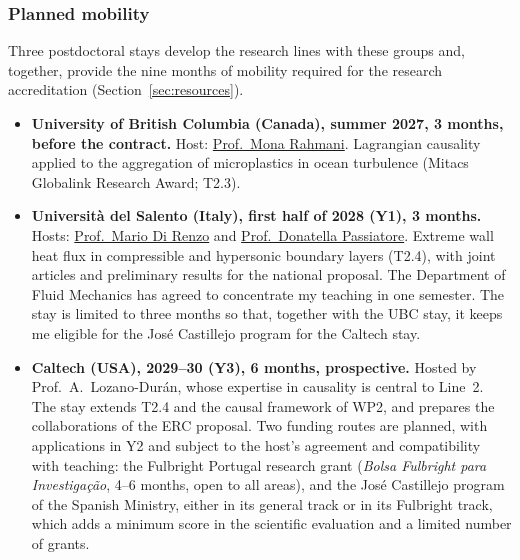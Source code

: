 \documentclass[11pt]{article}
\begin{document}
\subsubsection*{Planned mobility}
Three postdoctoral stays develop the research lines with these groups and, together, provide the
nine months of mobility required for the research accreditation (Section~\ref{sec:resources}).
\begin{itemize}
  \item \textbf{University of British Columbia (Canada), summer 2027, 3 months, before the
  contract.} Host: \href{https://chbe.ubc.ca/mona-rahmani/}{Prof.\ Mona Rahmani}. Lagrangian
  causality applied to the aggregation of microplastics in ocean turbulence (Mitacs Globalink
  Research Award; T2.3).
  
  \item \textbf{Universit\`a del Salento (Italy), first half of 2028 (Y1), 3 months.} Hosts:
  \href{https://www.unisalento.it/scheda-utente/-/people/mario.direnzo}{Prof.\ Mario Di Renzo}
  and \href{https://www.unisalento.it/scheda-utente/-/people/donatella.passiatore}{Prof.\
  Donatella Passiatore}. Extreme wall heat flux in compressible and hypersonic boundary layers (T2.4), with
  joint articles and preliminary results for the national proposal. The Department of Fluid
  Mechanics has agreed to concentrate my teaching in one semester. The stay is limited to
  three months so that, together with the UBC stay, it keeps me eligible for the José
  Castillejo program for the Caltech stay.
  
  \item \textbf{Caltech (USA), 2029--30 (Y3), 6 months,
  prospective.} Hosted by Prof.\ A.\ Lozano-Dur\'an, whose expertise in causality is central to Line~2. The stay extends T2.4 and the causal framework of WP2, and prepares the collaborations of the ERC proposal. Two funding routes are planned,
  with applications in Y2 and subject to the host's agreement and compatibility with
  teaching: the Fulbright Portugal research grant (\emph{Bolsa Fulbright para
  Investiga\c{c}\~ao}, 4--6 months, open to all areas), and the José Castillejo program of the
  Spanish Ministry, either in its general track or in its Fulbright track, which adds a minimum
  score in the scientific evaluation and a limited number of grants.
\end{itemize}
\end{document}

